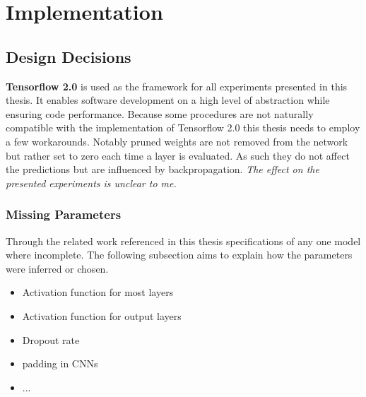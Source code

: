 \chapter{Implementation}
\label{ch:implementation}

\section{Design Decisions}
\textbf{Tensorflow 2.0} is used as the framework for all experiments presented in this thesis. It enables software development on a high level of abstraction while ensuring code performance. Because some
procedures are not naturally compatible with the implementation of Tensorflow 2.0  this thesis needs to employ a few workarounds. Notably pruned weights are not removed from the network but rather set to zero each time a layer is evaluated. As such they do not affect the predictions but are influenced by backpropagation. \textit{The effect on the presented experiments is unclear to me.}

\subsection{Missing Parameters}
Through the related work referenced in this thesis specifications of any one model where incomplete. The following subsection aims to explain how the parameters were inferred or chosen. 
\begin{itemize}
	\item Activation function for most layers
	\item Activation function for output layers
	\item Dropout rate
	\item padding in CNNs
	\item ...
\end{itemize}

